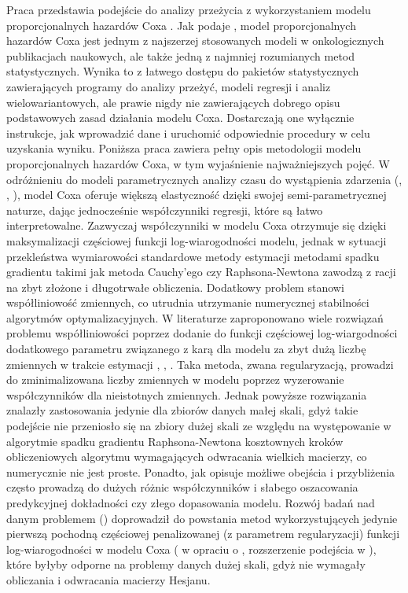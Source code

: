 Praca przedstawia podejście do analizy przeżycia z wykorzystaniem modelu proporcjonalnych hazardów Coxa \cite{cox}. Jak podaje \cite{assel}, model proporcjonalnych hazardów Coxa jest jednym z najszerzej stosowanych modeli w onkologicznych publikacjach naukowych, ale także jedną z najmniej rozumianych metod statystycznych. Wynika to z łatwego dostępu do pakietów statystycznych zawierających programy do analizy przeżyć, modeli regresji i analiz wielowariantowych, ale prawie nigdy nie zawierających dobrego opisu podstawowych zasad działania modelu Coxa. Dostarczają one wyłącznie instrukcje, jak wprowadzić dane i uruchomić odpowiednie procedury w celu uzyskania wyniku. Poniższa praca zawiera pełny opis metodologii modelu proporcjonalnych hazardów Coxa, w tym wyjaśnienie najważniejszych pojęć. W odróżnieniu do modeli parametrycznych analizy czasu do wystąpienia zdarzenia (\cite{klein}, \cite{collet}, \cite{hosmer}), model Coxa oferuje większą elastyczność dzięki swojej semi-parametrycznej naturze, dając jednocześnie  współczynniki regresji, które są łatwo interpretowalne. Zazwyczaj współczynniki w modelu Coxa otrzymuje się dzięki maksymalizacji częściowej funkcji log-wiarogodności modelu, jednak w sytuacji przekleństwa wymiarowości standardowe metody estymacji metodami spadku gradientu takimi jak metoda Cauchy'ego czy Raphsona-Newtona zawodzą z racji na zbyt złożone i długotrwałe obliczenia. Dodatkowy problem stanowi współliniowość zmiennych, co utrudnia utrzymanie numerycznej stabilności algorytmów optymalizacyjnych. W literaturze zaproponowano wiele rozwiązań problemu współliniowości poprzez dodanie do funkcji częściowej log-wiargodności dodatkowego parametru związanego z karą dla modelu za zbyt dużą liczbę zmiennych w trakcie estymacji \cite{parkm}, \cite{sohn}, \cite{goemann} . Taka metoda, zwana regularyzacją, prowadzi do zminimalizowana liczby zmiennych w modelu poprzez wyzerowanie współczynników dla nieistotnych zmiennych. Jednak powyższe rozwiązania znalazły zastosowania jedynie dla zbiorów danych małej skali, gdyż takie podejście nie przeniosło się na zbiory dużej skali ze względu na występowanie w algorytmie spadku gradientu Raphsona-Newtona kosztownych kroków obliczeniowych algorytmu wymagających odwracania wielkich macierzy, co numerycznie nie jest proste. Ponadto, jak opisuje \cite{mital} możliwe obejścia i przybliżenia często prowadzą do dużych różnic współczynników i słabego oszacowania predykcyjnej dokładności czy złego dopasowania modelu. Rozwój badań nad danym problemem (\cite{KIMKIM}) doprowadził do powstania metod wykorzystujących jedynie pierwszą pochodną częściowej penalizowanej (z parametrem regularyzacji) funkcji log-wiarogodności w modelu Coxa (\cite{sohn} w opraciu o \cite{KIM}, rozszerzenie podejścia w \cite{mital}), które byłyby odporne na problemy danych dużej skali, gdyż nie wymagały obliczania i odwracania macierzy Hesjanu. 

